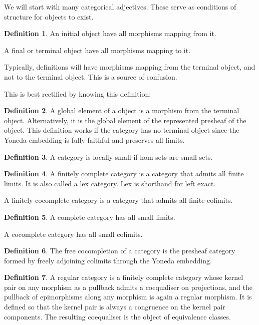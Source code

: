 \documentclass[10pt]{article}
\theoremstyle{plain}%
\theoremstyle{definition}
\newtheorem{definition}{Definition}[section]
\theoremstyle{remark}
\begin{document}
We will start with many categorical adjectives. These serve as conditions of structure for objects to exist.

\begin{definition}
    An initial object have all morphisms mapping from it.

    A final or terminal object have all morphisms mapping to it.
\end{definition}

Typically, definitions will have morphisms mapping from the terminal object, and not to the terminal object. This is a source of confusion.

This is best rectified by knowing this definition:

\begin{definition}
    A global element of a object is a morphism from the terminal object. Alternatively, it is the global element of the represented presheaf of the object. This definition works if the category has no terminal object since the Yoneda embedding is fully faithful and preserves all limits.
\end{definition}

\begin{definition}
    A category is locally small if hom sets are small sets.
\end{definition}

\begin{definition}
    A finitely complete category is a category that admits all finite limits. It is also called a lex category. Lex is shorthand for left exact. 

    A finitely cocomplete category is a category that admits all finite colimits.
\end{definition}

\begin{definition}
    A complete category has all small limits.

    A cocomplete category has all small colimits.
\end{definition}

\begin{definition}
    The free cocompletion of a category is the presheaf category formed by freely adjoining colimits through the Yoneda embedding.
\end{definition}

\begin{definition}
    A regular category is a finitely complete category whose kernel pair on any morphism as a pullback admits a coequaliser on projections, and the pullback of epimorphisms along any morphism is again a regular morphism. It is defined so that the kernel pair is always a congruence on the kernel pair components. The resulting coequaliser is the object of equivalence classes.
\end{definition}
\end{document}
